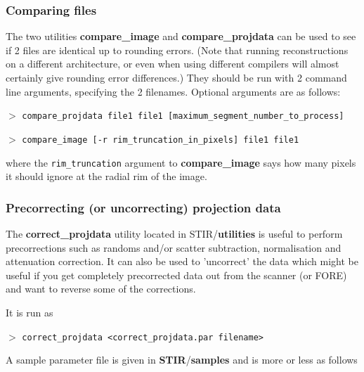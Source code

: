 \documentclass{article}
\newcommand{\cmdline}[1]{\par \noindent $>$ \texttt{#1}\par}
\begin{document}
\subsubsection{
Comparing files}

The two utilities \textbf{compare\_image} and \textbf{compare\_projdata} 
can be used to see if 2 files are identical up to rounding errors. 
(Note that running reconstructions on a different architecture, 
or even when using different compilers will almost certainly 
give rounding error differences.) They should be run with 2 command 
line arguments, specifying the 2 filenames. Optional arguments 
are as follows:
\cmdline{compare\_projdata file1 file1 
[maximum\_segment\_number\_to\_process]}
\cmdline{compare\_image [-r rim\_truncation\_in\_pixels] file1 file1}


where the \texttt{rim\_truncation} argument to \textbf{compare\_image}  says 
how many pixels it should ignore at the radial rim of the image.



\subsubsection{
Precorrecting (or uncorrecting) projection data}

The \textbf{correct\_projdata} utility located in STIR/\textbf{utilities} 
is useful to perform precorrections such as randoms and/or scatter 
subtraction, normalisation and attenuation correction. It can 
also be used to 'uncorrect' the data which might be useful if 
you get completely precorrected data out from the scanner (or 
FORE) and want to reverse some of the corrections.


It is run as
\cmdline{correct\_projdata \texttt{<}correct\_projdata.par filename\texttt{>}}


A sample parameter file is given in \textbf{STIR}/\textbf{samples} and 
is more or less as follows
\end{document}
